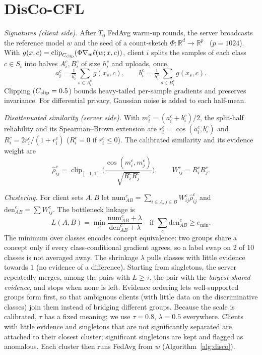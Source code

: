 \documentclass[journal]{IEEEtran}
\theoremstyle{definition}
\newcommand{\R}{\mathbb{R}}
\newcommand{\rhohat}{\hat\rho}
\begin{document}
\section{DisCo-CFL}\label{sec:method}
\emph{Signatures (client side).} After $T_0$ FedAvg warm-up rounds, the server broadcasts the reference model $w$ and the seed of a count-sketch $\Phi:\R^d\to\R^p$~\cite{charikar2002countsketch} ($p=1024$). With $g(x,c)=\operatorname{clip}_{C_{\rm clip}}(\Phi\nabla_w\ell(w;x,c))$, client $i$ splits the samples of each class $c\in S_i$ into halves $A_i^c,B_i^c$ of size $h_i^c$ and uploads, once,
\begin{equation*}
a_i^c=\tfrac1{h_i^c}\textstyle\sum_{s\in A_i^c}g(x_s,c),\qquad b_i^c=\tfrac1{h_i^c}\textstyle\sum_{s\in B_i^c}g(x_s,c).
\end{equation*}
Clipping ($C_{\rm clip}=0.5$) bounds heavy-tailed per-sample gradients and preserves invariance. For differential privacy, Gaussian noise is added to each half-mean.

\emph{Disattenuated similarity (server side).} With $m_i^c=(a_i^c+b_i^c)/2$, the split-half reliability and its Spearman--Brown extension are $r_i^c=\cos(a_i^c,b_i^c)$ and $R_i^c=2r_i^c/(1+r_i^c)$ ($R_i^c=0$ if $r_i^c\le0$). The calibrated similarity and its evidence weight are
\begin{equation}\label{eq:disatt}
\rhohat_{ij}^c=\operatorname{clip}_{[-1,1]}\!\Big(\frac{\cos(m_i^c,m_j^c)}{\sqrt{R_i^cR_j^c}}\Big),\qquad W_{ij}^c=R_i^cR_j^c .
\end{equation}

\emph{Clustering.} For client sets $A,B$ let $\mathrm{num}^c_{AB}=\sum_{i\in A,j\in B}W^c_{ij}\rhohat^c_{ij}$ and $\mathrm{den}^c_{AB}=\sum W^c_{ij}$. The bottleneck linkage is
\begin{equation}\label{eq:link}
L(A,B)=\min_c\frac{\mathrm{num}^c_{AB}+\lambda}{\mathrm{den}^c_{AB}+\lambda}\quad\text{if }\textstyle\sum_c\mathrm{den}^c_{AB}\ge e_{\min}.
\end{equation}
The minimum over classes encodes concept equivalence: two groups share a concept only if every class-conditional gradient agrees, so a label swap on 2 of 10 classes is not averaged away. The shrinkage $\lambda$ pulls classes with little evidence towards $1$ (no evidence of a difference). Starting from singletons, the server repeatedly merges, among the pairs with $L\ge\tau$, the pair with the \emph{largest shared evidence}, and stops when none is left. Evidence ordering lets well-supported groups form first, so that ambiguous clients (with little data on the discriminative classes) join them instead of bridging different groups. Because the scale is calibrated, $\tau$ has a fixed meaning; we use $\tau=0.8$, $\lambda=0.5$ everywhere. Clients with little evidence and singletons that are not significantly separated are attached to their closest cluster; significant singletons are kept and flagged as anomalous. Each cluster then runs FedAvg from $w$ (Algorithm~\ref{alg:disco}).
\end{document}
